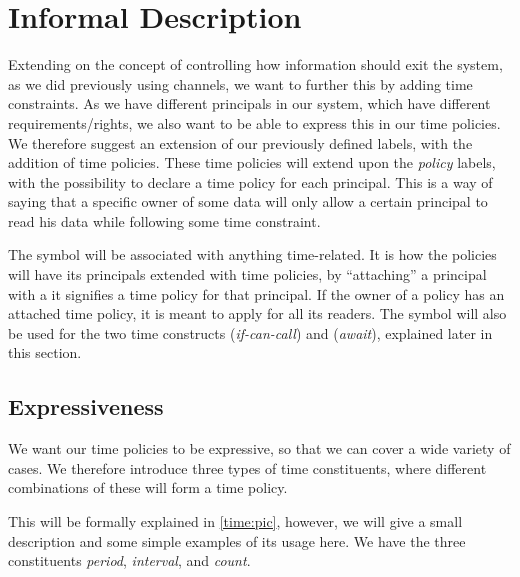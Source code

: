 
\section{Informal Description}
Extending on the concept of controlling how information should exit the system, as we did previously using channels, we want to further this by adding time constraints.
As we have different principals in our system, which have different requirements/rights, we also want to be able to express this in our time policies.
We therefore suggest an extension of our previously defined labels, with the addition of time policies.
These time policies will extend upon the \emph{policy} labels, with the possibility to declare a time policy for each principal.
This is a way of saying that a specific owner of some data will only allow a certain principal to read his data while following some time constraint.

The  symbol will be associated with anything time-related.
It is how the policies will have its principals extended with time policies, by ``attaching'' a principal with a  it signifies a time policy for that principal.
If the owner of a policy has an attached time policy, it is meant to apply for all its readers.
The  symbol will also be used for the two time constructs  (\emph{if-can-call})  and  (\emph{await}), explained later in this section.

\subsection{Expressiveness}
We want our time policies to be expressive, so that we can cover a wide variety of cases.
We therefore introduce three types of time constituents, where different combinations of these will form a time policy.

This will be formally explained in \cref{time:pic}, however, we will give a small description and some simple examples of its usage here.
We have the three constituents \emph{period}, \emph{interval}, and \emph{count}.

